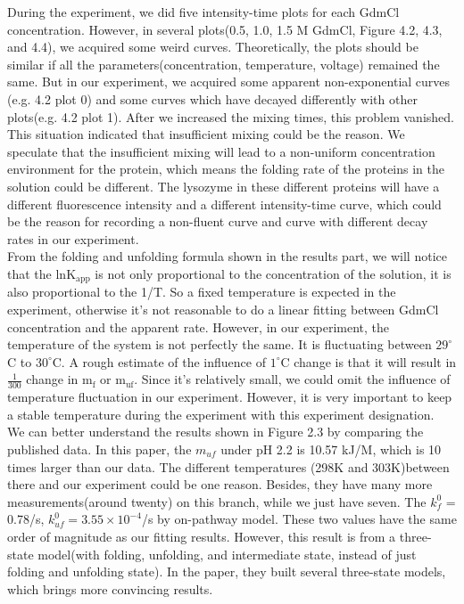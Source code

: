 \documentclass[a4paper,english,12pt,bibliography=totoc]{scrreprt}
\begin{document}
During the experiment, we did five intensity-time plots for each GdmCl concentration. However, in several plots(0.5, 1.0, 1.5 M GdmCl, Figure 4.2, 4.3, and 4.4), we acquired some weird curves. Theoretically, the plots should be similar if all the parameters(concentration, temperature, voltage) remained the same. But in our experiment, we acquired some apparent non-exponential curves (e.g. 4.2 plot 0) and some curves which have decayed differently with other plots(e.g. 4.2 plot 1). After we increased the mixing times, this problem vanished. This situation indicated that insufficient mixing could be the reason. We speculate that the insufficient mixing will lead to a non-uniform concentration environment for the protein, which means the folding rate of the proteins in the solution could be different. The lysozyme in these different proteins will have a different fluorescence intensity and a different intensity-time curve, which could be the reason for recording a non-fluent curve and curve with different decay rates in our experiment.\\

From the folding and unfolding formula shown in the results part, we will notice that the $\mathrm{lnK_{app}}$ is not only proportional to the concentration of the solution, it is also proportional to the 1/T. So a fixed temperature is expected in the experiment, otherwise it's not reasonable to do a linear fitting between GdmCl concentration and the apparent rate. However, in our experiment, the temperature of the system is not perfectly the same. It is fluctuating between $29^\circ $C to $30^\circ $C. A rough estimate of the influence of $1^\circ$C change is that it will result in $\frac{1}{300}$ change in $\mathrm{m_f}$ or $\mathrm{m_{uf}}$. Since it's relatively small, we could omit the influence of temperature fluctuation in our experiment. However, it is very important to keep a stable temperature during the experiment with this experiment designation.\\

We can better understand the results shown in Figure 2.3 by comparing the published\cite{sasahara} data. In this paper, the $m_{uf}$ under pH 2.2 is 10.57 kJ/M, which is 10 times larger than our data. The different temperatures (298K and 303K)between there and our experiment could be one reason. Besides, they have many more measurements(around twenty) on this branch, while we just have seven. The $k_f^0$ = 0.78/s, $k_{uf}^0 = 3.55 \times 10^{-4}$/s by on-pathway model. These two values have the same order of magnitude as our fitting results. However, this result is from a three-state model(with folding, unfolding, and intermediate state, instead of just folding and unfolding state). In the paper, they built several three-state models, which brings more convincing results. \\
\end{document}
